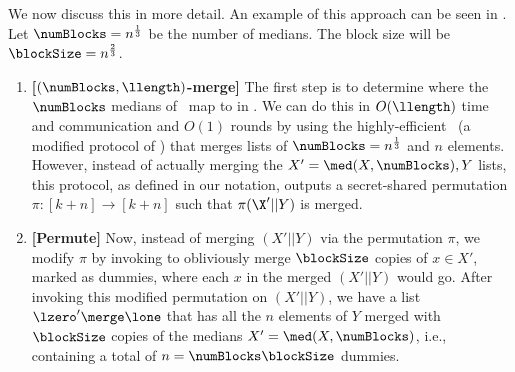 \noindent We now discuss this in more detail. An example of this approach can be seen in .
Let $\numBlocks = n^{\frac{1}{3}}$ be the number of medians. The block size will be $\blockSize=n^{\frac{2}{3}}$.

\begin{enumerate}

\item \textbf{[$(\numBlocks,\llength)$-merge]} The first step is to determine where the $\numBlocks$ medians of \X\ map to in \Y.
We can do this in $O(\llength)$ time and communication and $O(1)$ rounds by using the highly-efficient  \knmergeprotocol\ (a modified  protocol of \cite{EPRINT:BBDLO22}) that merges lists of $\numBlocks=n^{\frac{1}{3}}$ and $n$ elements.
However, instead of actually merging the $X'=\med(X, \numBlocks),Y$ lists, this protocol, as defined in our notation, outputs a secret-shared permutation $\pi: [k+n] \rightarrow [k+n]$ such that $\pi(\X'||Y)$ is merged.


\item \textbf{[Permute]} \label{step:insertdummies}Now, instead of merging $(X'|| Y)$ via the permutation $\pi$, we modify $\pi$ by invoking \updatepermutation to obliviously merge $\blockSize$ copies of $x\in X'$, marked as dummies, where each $x$ in the merged $(X'||Y)$ would go. After invoking this modified permutation on $(X'|| Y)$, we have a list $\lzero' \merge \lone$ that has all the $n$  elements of $Y$ merged with $\blockSize$ copies of the medians $X'=\med(X,\numBlocks)$, i.e., containing a total of $n=\numBlocks \blockSize$ dummies. %



\end{enumerate}
